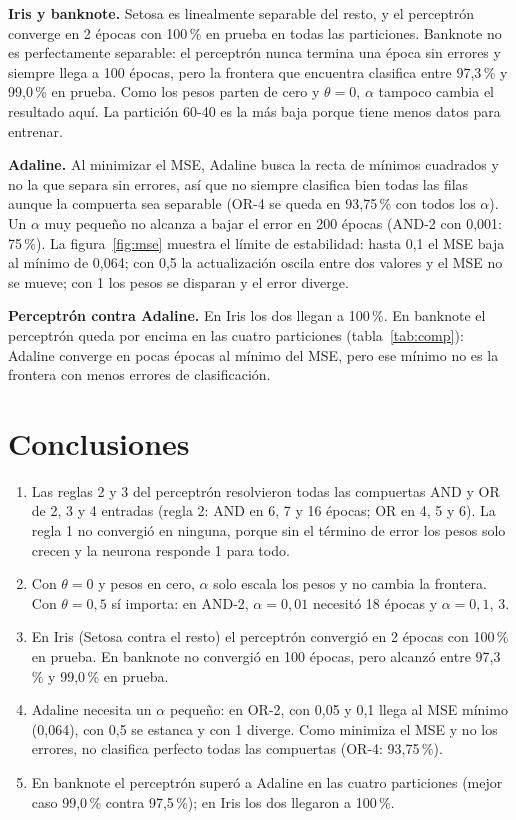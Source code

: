 \documentclass[11pt,letterpaper]{article}
\begin{document}
\textbf{Iris y banknote.} Setosa es linealmente separable del resto, y el perceptrón converge en 2 épocas con 100\,\% en prueba en todas las particiones. Banknote no es perfectamente separable: el perceptrón nunca termina una época sin errores y siempre llega a 100 épocas, pero la frontera que encuentra clasifica entre 97,3\,\% y 99,0\,\% en prueba. Como los pesos parten de cero y $\theta = 0$, $\alpha$ tampoco cambia el resultado aquí. La partición 60-40 es la más baja porque tiene menos datos para entrenar.

\textbf{Adaline.} Al minimizar el MSE, Adaline busca la recta de mínimos cuadrados y no la que separa sin errores, así que no siempre clasifica bien todas las filas aunque la compuerta sea separable (OR-4 se queda en 93,75\,\% con todos los $\alpha$). Un $\alpha$ muy pequeño no alcanza a bajar el error en 200 épocas (AND-2 con 0,001: 75\,\%). La figura~\ref{fig:mse} muestra el límite de estabilidad: hasta 0,1 el MSE baja al mínimo de 0,064; con 0,5 la actualización oscila entre dos valores y el MSE no se mueve; con 1 los pesos se disparan y el error diverge.

\textbf{Perceptrón contra Adaline.} En Iris los dos llegan a 100\,\%. En banknote el perceptrón queda por encima en las cuatro particiones (tabla~\ref{tab:comp}): Adaline converge en pocas épocas al mínimo del MSE, pero ese mínimo no es la frontera con menos errores de clasificación.

\section{Conclusiones}

\begin{enumerate}
\item Las reglas 2 y 3 del perceptrón resolvieron todas las compuertas AND y OR de 2, 3 y 4 entradas (regla 2: AND en 6, 7 y 16 épocas; OR en 4, 5 y 6). La regla 1 no convergió en ninguna, porque sin el término de error los pesos solo crecen y la neurona responde 1 para todo.
\item Con $\theta = 0$ y pesos en cero, $\alpha$ solo escala los pesos y no cambia la frontera. Con $\theta = 0{,}5$ sí importa: en AND-2, $\alpha = 0{,}01$ necesitó 18 épocas y $\alpha = 0{,}1$, 3.
\item En Iris (Setosa contra el resto) el perceptrón convergió en 2 épocas con 100\,\% en prueba. En banknote no convergió en 100 épocas, pero alcanzó entre 97,3\,\% y 99,0\,\% en prueba.
\item Adaline necesita un $\alpha$ pequeño: en OR-2, con 0,05 y 0,1 llega al MSE mínimo (0,064), con 0,5 se estanca y con 1 diverge. Como minimiza el MSE y no los errores, no clasifica perfecto todas las compuertas (OR-4: 93,75\,\%).
\item En banknote el perceptrón superó a Adaline en las cuatro particiones (mejor caso 99,0\,\% contra 97,5\,\%); en Iris los dos llegaron a 100\,\%.
\end{enumerate}
\end{document}
